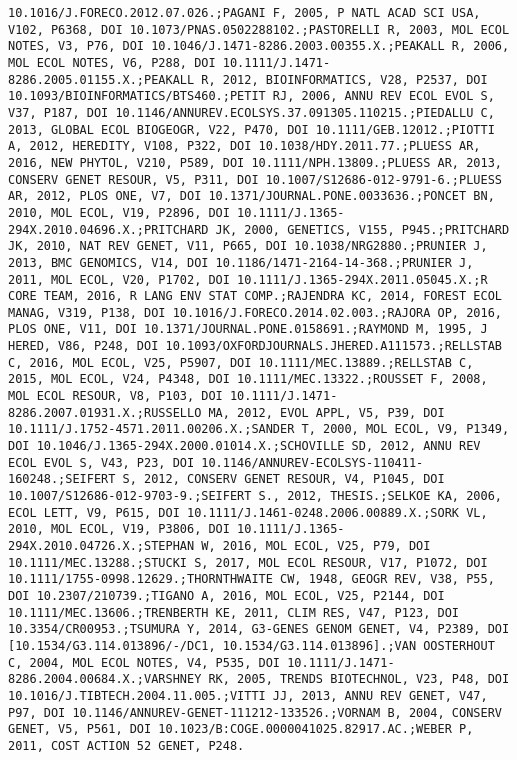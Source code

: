 \documentclass[]{article}
\begin{document}
\begin{verbatim}
10.1016/J.FORECO.2012.07.026.;PAGANI F, 2005, P NATL ACAD SCI USA, V102, P6368, DOI 10.1073/PNAS.0502288102.;PASTORELLI R, 2003, MOL ECOL NOTES, V3, P76, DOI 10.1046/J.1471-8286.2003.00355.X.;PEAKALL R, 2006, MOL ECOL NOTES, V6, P288, DOI 10.1111/J.1471-8286.2005.01155.X.;PEAKALL R, 2012, BIOINFORMATICS, V28, P2537, DOI 10.1093/BIOINFORMATICS/BTS460.;PETIT RJ, 2006, ANNU REV ECOL EVOL S, V37, P187, DOI 10.1146/ANNUREV.ECOLSYS.37.091305.110215.;PIEDALLU C, 2013, GLOBAL ECOL BIOGEOGR, V22, P470, DOI 10.1111/GEB.12012.;PIOTTI A, 2012, HEREDITY, V108, P322, DOI 10.1038/HDY.2011.77.;PLUESS AR, 2016, NEW PHYTOL, V210, P589, DOI 10.1111/NPH.13809.;PLUESS AR, 2013, CONSERV GENET RESOUR, V5, P311, DOI 10.1007/S12686-012-9791-6.;PLUESS AR, 2012, PLOS ONE, V7, DOI 10.1371/JOURNAL.PONE.0033636.;PONCET BN, 2010, MOL ECOL, V19, P2896, DOI 10.1111/J.1365-294X.2010.04696.X.;PRITCHARD JK, 2000, GENETICS, V155, P945.;PRITCHARD JK, 2010, NAT REV GENET, V11, P665, DOI 10.1038/NRG2880.;PRUNIER J, 2013, BMC GENOMICS, V14, DOI 10.1186/1471-2164-14-368.;PRUNIER J, 2011, MOL ECOL, V20, P1702, DOI 10.1111/J.1365-294X.2011.05045.X.;R CORE TEAM, 2016, R LANG ENV STAT COMP.;RAJENDRA KC, 2014, FOREST ECOL MANAG, V319, P138, DOI 10.1016/J.FORECO.2014.02.003.;RAJORA OP, 2016, PLOS ONE, V11, DOI 10.1371/JOURNAL.PONE.0158691.;RAYMOND M, 1995, J HERED, V86, P248, DOI 10.1093/OXFORDJOURNALS.JHERED.A111573.;RELLSTAB C, 2016, MOL ECOL, V25, P5907, DOI 10.1111/MEC.13889.;RELLSTAB C, 2015, MOL ECOL, V24, P4348, DOI 10.1111/MEC.13322.;ROUSSET F, 2008, MOL ECOL RESOUR, V8, P103, DOI 10.1111/J.1471-8286.2007.01931.X.;RUSSELLO MA, 2012, EVOL APPL, V5, P39, DOI 10.1111/J.1752-4571.2011.00206.X.;SANDER T, 2000, MOL ECOL, V9, P1349, DOI 10.1046/J.1365-294X.2000.01014.X.;SCHOVILLE SD, 2012, ANNU REV ECOL EVOL S, V43, P23, DOI 10.1146/ANNUREV-ECOLSYS-110411-160248.;SEIFERT S, 2012, CONSERV GENET RESOUR, V4, P1045, DOI 10.1007/S12686-012-9703-9.;SEIFERT S., 2012, THESIS.;SELKOE KA, 2006, ECOL LETT, V9, P615, DOI 10.1111/J.1461-0248.2006.00889.X.;SORK VL, 2010, MOL ECOL, V19, P3806, DOI 10.1111/J.1365-294X.2010.04726.X.;STEPHAN W, 2016, MOL ECOL, V25, P79, DOI 10.1111/MEC.13288.;STUCKI S, 2017, MOL ECOL RESOUR, V17, P1072, DOI 10.1111/1755-0998.12629.;THORNTHWAITE CW, 1948, GEOGR REV, V38, P55, DOI 10.2307/210739.;TIGANO A, 2016, MOL ECOL, V25, P2144, DOI 10.1111/MEC.13606.;TRENBERTH KE, 2011, CLIM RES, V47, P123, DOI 10.3354/CR00953.;TSUMURA Y, 2014, G3-GENES GENOM GENET, V4, P2389, DOI [10.1534/G3.114.013896/-/DC1, 10.1534/G3.114.013896].;VAN OOSTERHOUT C, 2004, MOL ECOL NOTES, V4, P535, DOI 10.1111/J.1471-8286.2004.00684.X.;VARSHNEY RK, 2005, TRENDS BIOTECHNOL, V23, P48, DOI 10.1016/J.TIBTECH.2004.11.005.;VITTI JJ, 2013, ANNU REV GENET, V47, P97, DOI 10.1146/ANNUREV-GENET-111212-133526.;VORNAM B, 2004, CONSERV GENET, V5, P561, DOI 10.1023/B:COGE.0000041025.82917.AC.;WEBER P, 2011, COST ACTION 52 GENET, P248.

\end{verbatim}
\end{document}
